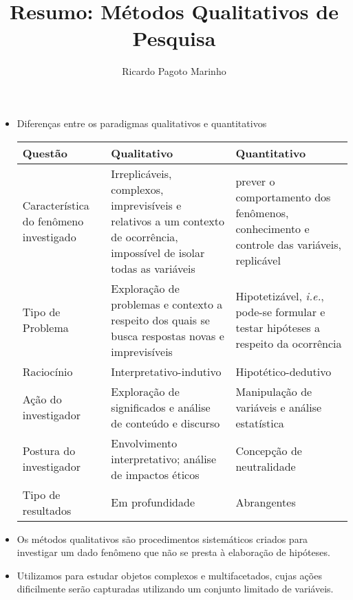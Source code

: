 \documentclass[11pt,a4paper]{book}
\title{Resumo: Métodos Qualitativos de Pesquisa}
\author{Ricardo Pagoto Marinho}
\begin{document}
\maketitle
	\begin{itemize}
		\item Diferenças entre os paradigmas qualitativos e quantitativos
		
		\begin{tabular}{|p{3cm}|p{4cm}|p{4cm}|}
		\hline
		Questão & Qualitativo & Quantitativo\\
		\hline
		Característica do fenômeno investigado & Irreplicáveis, complexos, imprevisíveis e relativos a um contexto de ocorrência, impossível de isolar todas as variáveis & prever o comportamento dos fenômenos, conhecimento e controle das variáveis, replicável\\
		\hline
		Tipo de Problema & Exploração de problemas e contexto a respeito dos quais se busca respostas novas e imprevisíveis & Hipotetizável, \textit{i.e.}, pode-se formular e testar hipóteses a respeito da ocorrência\\
		\hline
		Raciocínio & Interpretativo-indutivo & Hipotético-dedutivo\\
		\hline
		Ação do investigador & Exploração de significados e análise de conteúdo e discurso & Manipulação de variáveis e análise estatística\\
		\hline
		Postura do investigador & Envolvimento interpretativo; análise de impactos éticos & Concepção de neutralidade\\
		\hline
		Tipo de resultados & Em profundidade & Abrangentes\\
		\hline
		\end{tabular}
		
		\item Os métodos qualitativos são procedimentos sistemáticos criados para investigar um dado fenômeno que não se presta à elaboração de hipóteses.
		
		\item Utilizamos para estudar objetos complexos e multifacetados, cujas ações dificilmente serão capturadas utilizando um conjunto limitado de variáveis.
		

\end{itemize}
\end{document}
